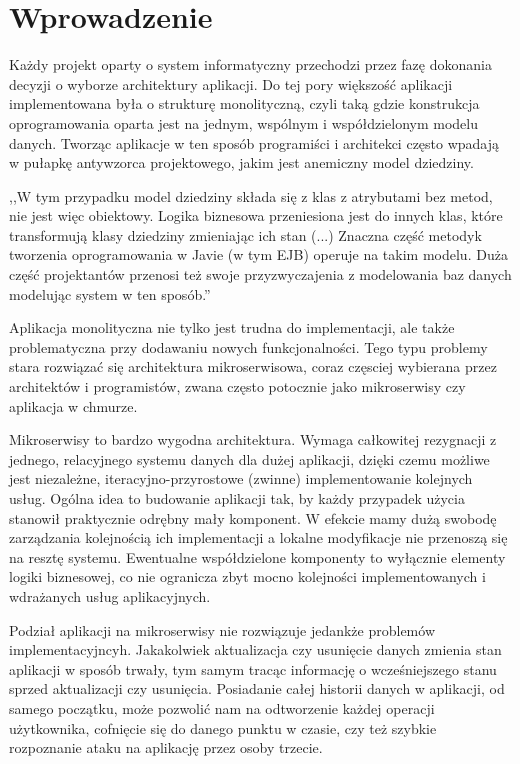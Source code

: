 \chapter{Wprowadzenie}
\label{ch:wprowadz}

Każdy projekt oparty o system informatyczny przechodzi przez fazę dokonania decyzji o wyborze architektury aplikacji. Do tej pory większość aplikacji implementowana była o strukturę monolityczną, czyli taką gdzie konstrukcja oprogramowania oparta jest na jednym, wspólnym i współdzielonym modelu danych.
Tworząc aplikacje w ten sposób programiści i architekci często wpadają w pułapkę antywzorca projektowego, jakim jest anemiczny model dziedziny.

,,W tym przypadku model dziedziny składa się z klas z atrybutami bez metod, nie jest więc obiektowy. Logika biznesowa przeniesiona jest do innych klas, które transformują klasy dziedziny zmieniając ich stan (...) Znaczna część metodyk tworzenia oprogramowania w Javie (w tym EJB) operuje na takim modelu. Duża część projektantów przenosi też swoje przyzwyczajenia z modelowania baz danych modelując system w ten sposób.''\cite{Antywzorzec-projektowy}

Aplikacja monolityczna nie tylko jest trudna do implementacji, ale także problematyczna przy dodawaniu nowych funkcjonalności. Tego typu problemy stara rozwiązać się architektura mikroserwisowa, coraz częsciej wybierana przez architektów i programistów, zwana często potocznie jako mikroserwisy czy aplikacja w chmurze. 

Mikroserwisy to bardzo wygodna architektura. Wymaga całkowitej rezygnacji z jednego, relacyjnego systemu danych dla dużej aplikacji, dzięki czemu możliwe jest niezależne, iteracyjno-przyrostowe (zwinne) implementowanie kolejnych usług. Ogólna idea to budowanie aplikacji tak, by każdy przypadek użycia stanowił praktycznie odrębny mały komponent. W efekcie mamy dużą swobodę zarządzania kolejnością ich implementacji a lokalne modyfikacje nie przenoszą się na resztę systemu. Ewentualne współdzielone komponenty to wyłącznie elementy logiki biznesowej, co nie ogranicza zbyt mocno kolejności implementowanych i wdrażanych usług aplikacyjnych. \cite{Mikroserwisy-IT-Consulting}


Podział aplikacji na mikroserwisy nie rozwiązuje jedankże problemów implementacyjncyh.
Jakakolwiek aktualizacja czy usunięcie danych zmienia stan aplikacji w sposób trwały, tym samym tracąc informację o wcześniejszego stanu sprzed aktualizacji czy usunięcia.
Posiadanie całej historii danych w aplikacji, od samego początku, może pozwolić nam na odtworzenie każdej operacji użytkownika, cofnięcie się do danego punktu w czasie, czy też szybkie rozpoznanie ataku na aplikację przez osoby trzecie.

